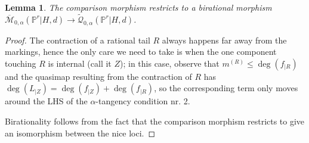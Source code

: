 \documentclass[11pt]{amsart}
\newcommand{\M}[4]{\overline{\mathcal M}_{#1,#2}(#3,#4)}
\newcommand{\Qt}[4]{\widetilde{\mathcal Q}_{#1,#2}(#3,#4)}
\newcommand{\PP}{\mathbb P}
\renewcommand{\to}{\rightarrow}
\theoremstyle{plain}
\newtheorem{lem}[thm]{Lemma}
\theoremstyle{definition}
\begin{document}
\begin{lem}\label{lem:comparison}
The comparison morphism restricts to a birational morphism $\M{0}{\alpha}{\PP^r|H}{d}\to \Qt{0}{\alpha}{\PP^r|H}{d}$.
\end{lem}
\begin{proof}
The contraction of a rational tail $R$ always happens far away from the markings, hence the only care we need to take is when the one component touching $R$ is internal (call it $Z$); in this case, observe that $m^{(R)}\leq\deg(f_{|R})$ and the quasimap resulting from the contraction of $R$ has $\deg(L_{|Z})=\deg(f_{|Z})+\deg(f_{|R})$, so the corresponding term only moves around the LHS of the $\alpha$-tangency condition nr. 2.

Birationality follows from the fact that the comparison morphism restricts to give an isomorphism between the nice loci.
\end{proof}
\end{document}
